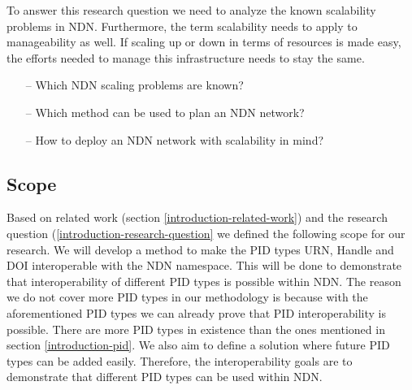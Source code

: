 To answer this research question we need to analyze the known scalability problems in NDN. Furthermore, the term scalability needs to apply to manageability as well. If scaling up or down in terms of resources is made easy, the efforts needed to manage this infrastructure needs to stay the same.
\begin{itemize}
    \item[--] Which NDN scaling problems are known?
    \item[--] Which method can be used to plan an NDN network?
    \item[--] How to deploy an NDN network with scalability in mind?
\end{itemize}

\subsection{Scope}
\label{introduction-scope}


Based on related work (section \ref{introduction-related-work}) and the research question (\ref{introduction-research-question} we defined the following scope for our research. We will develop a method to make the PID types URN, Handle and DOI interoperable with the NDN namespace. This will be done to demonstrate that interoperability of different PID types is possible within NDN. The reason we do not cover more PID types in our methodology is because with the aforementioned PID types we can already prove that PID interoperability is possible. There are more PID types in existence than the ones mentioned in section \ref{introduction-pid}. We also aim to define a solution where future PID types can be added easily. Therefore, the interoperability goals are to demonstrate that different PID types can be used within NDN. 


